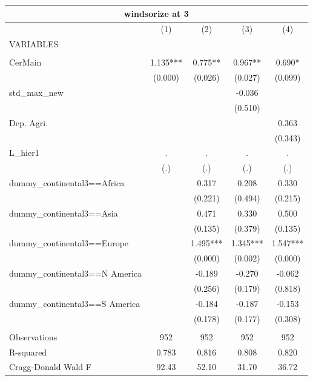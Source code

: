 \begin{tabular}{lcccc}
\multicolumn{5}{c}{windsorize at 3} \\ \hline
 & (1) & (2) & (3) & (4) \\
VARIABLES &  &  &  &  \\ \hline
 &  &  &  &  \\
CerMain & 1.135*** & 0.775** & 0.967** & 0.690* \\
 & (0.000) & (0.026) & (0.027) & (0.099) \\
std\_max\_new &  &  & -0.036 &  \\
 &  &  & (0.510) &  \\
Dep. Agri. &  &  &  & 0.363 \\
 &  &  &  & (0.343) \\
L\_hier1 & . & . & . & . \\
 & (.) & (.) & (.) & (.) \\
dummy\_continental3==Africa &  & 0.317 & 0.208 & 0.330 \\
 &  & (0.221) & (0.494) & (0.215) \\
dummy\_continental3==Asia &  & 0.471 & 0.330 & 0.500 \\
 &  & (0.135) & (0.379) & (0.135) \\
dummy\_continental3==Europe &  & 1.495*** & 1.345*** & 1.547*** \\
 &  & (0.000) & (0.002) & (0.000) \\
dummy\_continental3==N America &  & -0.189 & -0.270 & -0.062 \\
 &  & (0.256) & (0.179) & (0.818) \\
dummy\_continental3==S America &  & -0.184 & -0.187 & -0.153 \\
 &  & (0.178) & (0.177) & (0.308) \\
 &  &  &  &  \\
Observations & 952 & 952 & 952 & 952 \\
R-squared & 0.783 & 0.816 & 0.808 & 0.820 \\
 Cragg-Donald Wald F & 92.43 & 52.10 & 31.70 & 36.72 \\ \hline
\end{tabular}
